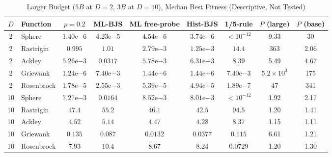 \documentclass[conference]{IEEEtran}
\begin{document}
\begin{table}[t]
\centering
\caption{Larger Budget ($5B$ at $D=2$, $3B$ at $D=10$), Median Best Fitness (Descriptive, Not Tested)}
\label{tab:large}
\scriptsize
\setlength{\tabcolsep}{3pt}
\begin{tabular}{@{}clccccccc@{}}
\toprule
$D$ & Function & $p{=}0.2$ & ML-BJS & ML free-probe & Hist-BJS & 1/5-rule & $P$ (large) & $P$ (base)\\
\midrule
2 & Sphere & $1.40\mathrm{e}{-6}$ & $4.23\mathrm{e}{-5}$ & $4.54\mathrm{e}{-6}$ & $3.74\mathrm{e}{-6}$ & $<\!10^{-12}$ & 9.33 & 30 \\
2 & Rastrigin & $0.995$ & $1.01$ & $2.79\mathrm{e}{-3}$ & $1.25\mathrm{e}{-3}$ & $14.4$ & 363 & 2.06 \\
2 & Ackley & $5.26\mathrm{e}{-3}$ & $0.0317$ & $5.78\mathrm{e}{-3}$ & $6.31\mathrm{e}{-3}$ & $8.39$ & 5.49 & 4.67 \\
2 & Griewank & $1.24\mathrm{e}{-6}$ & $7.40\mathrm{e}{-3}$ & $1.44\mathrm{e}{-6}$ & $1.44\mathrm{e}{-6}$ & $7.40\mathrm{e}{-3}$ & $5.2\times10^{3}$ & 175 \\
2 & Rosenbrock & $1.78\mathrm{e}{-5}$ & $2.55\mathrm{e}{-3}$ & $5.39\mathrm{e}{-5}$ & $4.94\mathrm{e}{-5}$ & $1.89\mathrm{e}{-7}$ & 47 & 341 \\
\midrule
10 & Sphere & $7.27\mathrm{e}{-3}$ & $0.0164$ & $8.52\mathrm{e}{-3}$ & $8.01\mathrm{e}{-3}$ & $<\!10^{-12}$ & 1.92 & 2.17 \\
10 & Rastrigin & $47.4$ & $55.2$ & $46.1$ & $42.5$ & $94.5$ & 1.20 & 1.41 \\
10 & Ackley & $4.52$ & $5.14$ & $4.47$ & $4.28$ & $8.37$ & 1.15 & 1.11 \\
10 & Griewank & $0.135$ & $0.087$ & $0.0132$ & $0.0377$ & $0.115$ & 6.61 & 1.21 \\
10 & Rosenbrock & $7.93$ & $10.4$ & $8.67$ & $8.24$ & $0.0729$ & 1.20 & 1.30 \\
\bottomrule
\end{tabular}
\end{table}
\end{document}
